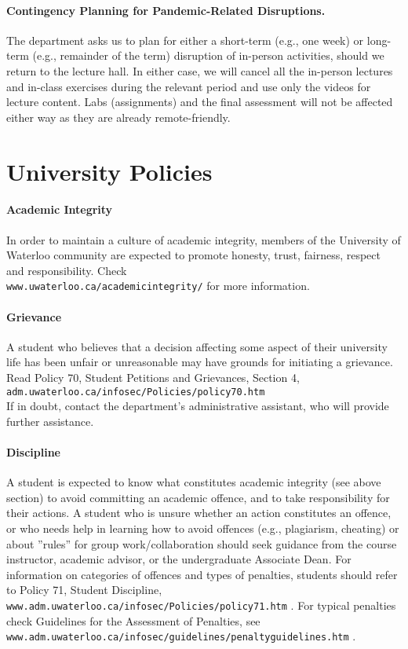 \paragraph{Contingency Planning for Pandemic-Related Disruptions.}
The department asks us to plan for either a short-term (e.g., one week) or long-term (e.g., remainder of the term) disruption of in-person activities, should we return to the lecture hall. In either case, we will cancel all the in-person lectures and in-class exercises during the relevant period and use only the videos for lecture content. Labs (assignments) and the final assessment will not be affected either way as they are already remote-friendly.

\section*{University Policies}

\paragraph{Academic Integrity}
In order to maintain a culture of academic integrity, members of the University of Waterloo community are expected to promote honesty, trust, fairness, respect and responsibility. Check\\
\texttt{www.uwaterloo.ca/academicintegrity/} for more information.

\paragraph{Grievance}
A student who believes that a decision affecting some aspect of their university life has been unfair or unreasonable may have grounds for initiating a grievance. Read Policy 70, Student Petitions and Grievances, Section 4, \texttt{adm.uwaterloo.ca/infosec/Policies/policy70.htm} \\
If in doubt, contact the department's administrative assistant, who will provide further assistance.

\paragraph{Discipline}
A student is expected to know what constitutes academic integrity (see above section) to avoid committing an academic offence, and to take responsibility for their actions. A student who is unsure whether an action constitutes an offence, or who needs help in learning how to avoid offences (e.g., plagiarism, cheating) or about ''rules'' for group work/collaboration should seek guidance from the course instructor, academic advisor, or the undergraduate Associate Dean. For information on categories of offences and types of penalties, students should refer to Policy 71, Student Discipline, \texttt{www.adm.uwaterloo.ca/infosec/Policies/policy71.htm} . For typical penalties check Guidelines for the Assessment of Penalties, see \\\texttt{www.adm.uwaterloo.ca/infosec/guidelines/penaltyguidelines.htm} .

